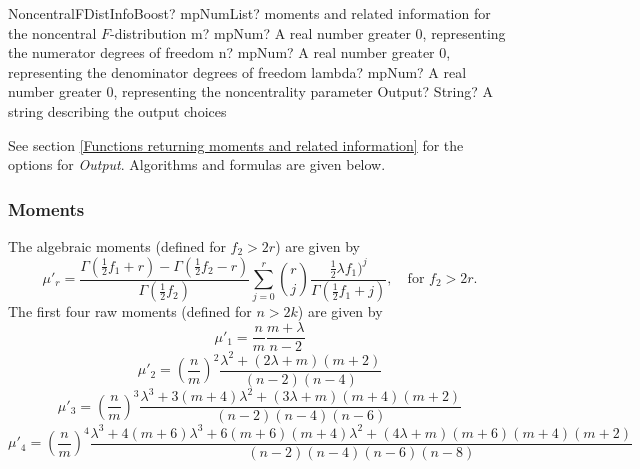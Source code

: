 \begin{mpFunctionsExtract}
	\mpFunctionFourNotImplemented
	{NoncentralFDistInfoBoost? mpNumList?  moments and related information for the noncentral $F$-distribution}
	{m? mpNum? A real number greater 0, representing the numerator  degrees of freedom}
	{n? mpNum? A real number greater 0, representing the denominator degrees of freedom}
	{lambda? mpNum? A real number greater 0, representing the noncentrality parameter}
	{Output? String? A string describing the output choices}
\end{mpFunctionsExtract}

\vspace{0.3cm}

See section \ref{Functions returning moments and related information} for the options for {\itshape\sffamily Output}. Algorithms and formulas are given below.


\subsubsection{Moments}
The algebraic moments (defined for $f_2 > 2r$) are given by
\begin{equation}
\mu'_r = \frac{\Gamma( \tfrac{1}{2}f_1+r)-\Gamma( \tfrac{1}{2}f_2-r)}{\Gamma( \tfrac{1}{2}f_2)} \sum_{j=0}^{r} { \binom{r}{j} \frac{\tfrac{1}{2}\lambda f_1)^j} {\Gamma( \tfrac{1}{2}f_1+j)} }, \quad \text{for } f_2 > 2r.
\end{equation}
The first four raw moments (defined for $n > 2k$) are given by 
\begin{equation*}
\mu'_1 = \frac{n}{m} \frac{m+\lambda}{n-2}
\end{equation*}
\begin{equation*}
\mu'_2 = \left(\frac{n}{m}\right)^2 \frac{\lambda^2+(2\lambda+m)(m+2)}{(n-2)(n-4)}
\end{equation*}
\begin{equation*}
\mu'_3 = \left(\frac{n}{m}\right)^3 \frac{\lambda^3+3(m+4)\lambda^2+(3\lambda+m)(m+4)(m+2)}{(n-2)(n-4)(n-6)}
\end{equation*}
\begin{equation*}
\mu'_4 = \left(\frac{n}{m}\right)^4 \frac{\lambda^3+4(m+6)\lambda^3+6(m+6)(m+4)\lambda^2+(4\lambda+m)(m+6)(m+4)(m+2)}{(n-2)(n-4)(n-6)(n-8)}
\end{equation*}



